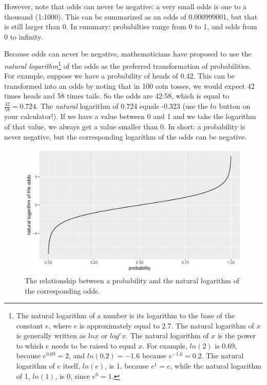 \documentclass[]{report}\usepackage[]{graphicx}\usepackage[]{color}
\makeatletter
\def\maxwidth{ %
  \ifdim\Gin@nat@width>\linewidth
    \linewidth
  \else
    \Gin@nat@width
  \fi
}
\newenvironment{knitrout}{}{} %
\makeatother
\begin{document}
However, note that odds can never be negative: a very small odds is one to a thousand (1:1000). This can be summarized as an odds of 0.000999001, but that is still larger than 0. In summary: probabilties range from 0 to 1, and odds from 0 to infinity.

Because odds can never be negative, mathematicians have proposed to use the \textit{natural logarithm}\footnote{The natural logarithm of a number is its logarithm to the base of the constant $e$, where $e$ is approximately equal to 2.7. The natural logarithm of $x$ is generally written as
$ln x$ or $log^e x$. The natural logarithm of $x$ is the power to which $e$ needs to be raised to equal $x$. For example, $ln(2)$ is 0.69, because $e^{0.69} = 2$, and $ln(0.2)=-1.6$ because $e^{-1.6}=0.2$. The natural logarithm of $e$ itself, $ln(e)$, is 1, because $e^1 = e$, while the natural logarithm of 1, $ln(1)$, is 0, since $e^0 = 1$.} of the odds  as the preferred transformation of probabilities. For example, suppose we have a probability of heads of 0.42. This can be transformed into an odds by noting that in 100 coin tosses, we would expect 42 times heads and 58 times tails. So the odds are 42:58, which is equal to $\frac{42}{58}=0.724$. The \textit{natural} logarithm of 0.724 equals -0.323 (use the $ln$ button on your calculator!). If we have a value between 0 and 1 and we take the logarithm of that value, we always get a value smaller than 0. In short: a probability is never negative, but the corresponding logarithm of the odds can be negative.




\begin{knitrout}
\color{fgcolor}\begin{figure}

{\centering \includegraphics[width=\maxwidth]{figure/gen_8-1} 

}

\caption[The relationship between a probability and the natural logarithm of the corresponding odds]{The relationship between a probability and the natural logarithm of the corresponding odds.}\label{fig:gen_8}
\end{figure}


\end{knitrout}
\end{document}
